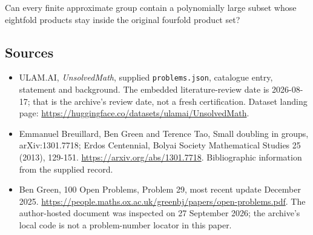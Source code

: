 \documentclass[11pt,a4paper]{article}
\begin{document}
Can every finite approximate group contain a polynomially large subset whose eightfold products stay inside the original fourfold product set?

\subsection{Sources}

{\small

\begin{itemize}

\item[\hypertarget{source:statement:1}{S1}] ULAM.AI, \emph{UnsolvedMath}, supplied \texttt{problems.json}, catalogue entry, statement and background. The embedded literature-review date is 2026-08-17; that is the archive’s review date, not a fresh certification. Dataset landing page: \url{https://huggingface.co/datasets/ulamai/UnsolvedMath}.

\item[\hypertarget{source:statement:2}{S2}] Emmanuel Breuillard, Ben Green and Terence Tao, Small doubling in groups, arXiv:1301.7718; Erdos Centennial, Bolyai Society Mathematical Studies 25 (2013), 129-151. \url{https://arxiv.org/abs/1301.7718}. Bibliographic information from the supplied record.

\item[\hypertarget{source:statement:3}{S3}] Ben Green, 100 Open Problems, Problem 29, most recent update December 2025. \url{https://people.maths.ox.ac.uk/greenbj/papers/open-problems.pdf}. The author-hosted document was inspected on 27 September 2026; the archive’s local code is not a problem-number locator in this paper.

\end{itemize}

}

\label{end:statement}
\end{document}

